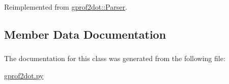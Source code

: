 Reimplemented from \hyperlink{classgprof2dot_1_1Parser_a681a0bc74e640c9c8e3d629dd03049fc}{gprof2dot::Parser}.



\subsection{Member Data Documentation}
\hypertarget{classgprof2dot_1_1SharkParser_add53c92f98ac5751eba4bc9586fefb6c}{
\subsubsection[{entries}]{}}
\label{classgprof2dot_1_1SharkParser_add53c92f98ac5751eba4bc9586fefb6c}
\hypertarget{classgprof2dot_1_1SharkParser_a3e10513646241304ce5208017eed21d4}{
\subsubsection[{stack}]{}}
\label{classgprof2dot_1_1SharkParser_a3e10513646241304ce5208017eed21d4}


The documentation for this class was generated from the following file:\begin{DoxyCompactItemize}
\item 
\hyperlink{gprof2dot_8py}{gprof2dot.py}\end{DoxyCompactItemize}
